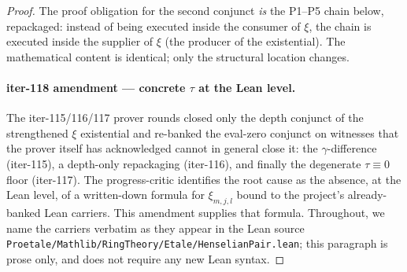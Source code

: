 \begin{proof}
The proof obligation for the second conjunct \emph{is} the
P1--P5 chain below, repackaged: instead of being executed inside
the consumer of $\xi$, the chain is executed inside the supplier
of $\xi$ (the producer of the existential). The mathematical
content is identical; only the structural location changes.

\paragraph{iter-118 amendment --- concrete $\tau$ at the Lean level.}
The iter-115/116/117 prover rounds closed only the depth
conjunct of the strengthened $\xi$ existential and re-banked the
eval-zero conjunct on witnesses that the prover itself has
acknowledged cannot in general close it: the $\gamma$-difference
(iter-115), a depth-only repackaging (iter-116), and finally the
degenerate $\tau \equiv 0$ floor (iter-117). The progress-critic
identifies the root cause as the absence, at the Lean level, of a
written-down formula for $\xi_{m,j,l}$ bound to the project's
already-banked Lean carriers. This amendment supplies that
formula. Throughout, we name the carriers verbatim as they appear
in the Lean source
\texttt{Proetale/Mathlib/RingTheory/Etale/HenselianPair.lean};
this paragraph is prose only, and does not require any new Lean
syntax.


\end{proof}
